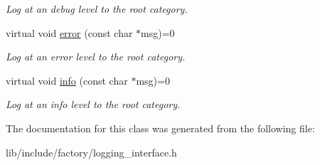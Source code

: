 \begin{DoxyCompactItemize}
\begin{DoxyCompactList}\small\item\em Log at an debug level to the root category. \end{DoxyCompactList}\item 
\hypertarget{classLoggingCategoryInterface_a526c3bec470411e17b10a6f38b5477c6}{virtual void \hyperlink{classLoggingCategoryInterface_a526c3bec470411e17b10a6f38b5477c6}{error} (const char $\ast$msg)=0}\label{classLoggingCategoryInterface_a526c3bec470411e17b10a6f38b5477c6}

\begin{DoxyCompactList}\small\item\em Log at an error level to the root category. \end{DoxyCompactList}\item 
\hypertarget{classLoggingCategoryInterface_a5e05b670e8298e0016af09ee5d1c50a6}{virtual void \hyperlink{classLoggingCategoryInterface_a5e05b670e8298e0016af09ee5d1c50a6}{info} (const char $\ast$msg)=0}\label{classLoggingCategoryInterface_a5e05b670e8298e0016af09ee5d1c50a6}

\begin{DoxyCompactList}\small\item\em Log at an info level to the root category. \end{DoxyCompactList}\end{DoxyCompactItemize}


The documentation for this class was generated from the following file\-:\begin{DoxyCompactItemize}
\item 
lib/include/factory/logging\-\_\-interface.\-h\end{DoxyCompactItemize}
